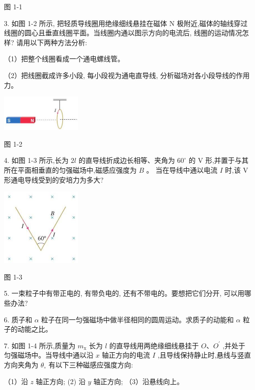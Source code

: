 \documentclass[10pt]{article}
\begin{document}
图 1-1

3. 如图 1-2 所示, 把轻质导线圈用绝缘细线悬挂在磁体 \(\mathrm{N}\) 极附近,磁体的轴线穿过线圈的圆心且垂直线圈平面。当线圈内通以图示方向的电流后, 线圈的运动情况怎样? 请用以下两种方法分析:

（1）把整个线圈看成一个通电螺线管。

（2）把线圈截成许多小段, 每小段视为通电直导线, 分析磁场对各小段导线的作用力。

\begin{center}
\includegraphics[max width=0.3\textwidth]{images/01910e72-c5b7-7ed5-a6d4-fb3a5faefc32_26_325815.jpg}
\end{center}

图 1-2

4. 如图 1-3 所示,长为 \({2l}\) 的直导线折成边长相等、夹角为 \({60}^{ \circ }\) 的 \(\mathrm{V}\) 形,并置于与其所在平面相垂直的匀强磁场中,磁感应强度为 \(B\) 。 当在导线中通以电流 \(I\) 时,该 \(\mathrm{V}\) 形通电导线受到的安培力为多大?

\begin{center}
\includegraphics[max width=0.3\textwidth]{images/01910e72-c5b7-7ed5-a6d4-fb3a5faefc32_26_747258.jpg}
\end{center}

图 1-3

5. 一束粒子中有带正电的, 有带负电的, 还有不带电的。要想把它们分开, 可以用哪些办法?

6. 质子和 \(\alpha\) 粒子在同一匀强磁场中做半径相同的圆周运动。求质子的动能和 \(\alpha\) 粒子的动能之比。

7. 如图 1-4 所示,质量为 \({m}_{\mathrm{x}}\) 长为 \(l\) 的直导线用两绝缘细线悬挂于 \(O\text{、}{O}^{\prime }\) ,并处于匀强磁场中。当导线中通以沿 \(x\) 轴正方向的电流 \(I\) ,且导线保持静止时,悬线与竖直方向夹角为 \({\theta }_{ \circ }\) 有以下三种磁感应强度方向:

（1）沿 \(z\) 轴正方向; (2) 沿 \(y\) 轴正方向; （3）沿悬线向上。
\end{document}
